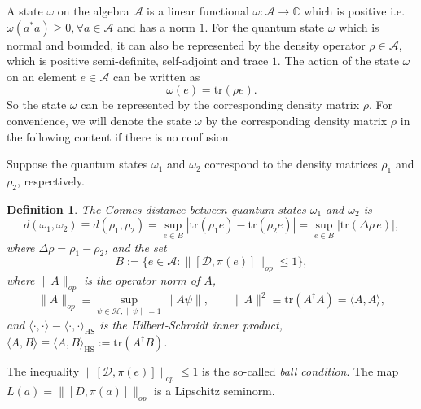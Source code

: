 \documentclass[a4paper,12pt]{article}
\newtheorem{definition}{Definition}
\begin{document}
A state $\omega$ on the algebra $\mathcal{A}$ is a linear functional $\omega :
\mathcal{A} \rightarrow \mathbb{C}$ which is positive i.e. $\omega (a^{\ast}
a) \geq 0, \forall a \in \mathcal{A}$ and has a norm $1$. For the quantum
state $\omega$ which is normal and bounded, it can also be represented by the
density operator $\rho \in \mathcal{A}$, which is positive semi-definite,
self-adjoint and trace $1$. The action of the state $\omega$ on an element $e
\in \mathcal{A}$ can be written as \cite{Revisiting}
\begin{equation}
  \omega (e) = \mathrm{tr} (\rho e) .
\end{equation}
So the state $\omega$ can be represented by the corresponding density matrix
$\rho$. For convenience, we will denote the state $\omega$ by the
corresponding density matrix $\rho$ in the following content if there is no
confusion.

Suppose the quantum states $\omega_1$ and $\omega_2$ correspond to the density
matrices $\rho_1$ and $\rho_2$, respectively.

\begin{definition}
  \cite{Connes1} The Connes distance between quantum states $\omega_1$ and
  $\omega_2$ is
  \begin{equation}
    d (\omega_1, \omega_2) \equiv d (\rho_1, \rho_2) = \sup_{e \in B} |
    \mathrm{tr} (\rho_1 e) - \mathrm{tr} (\rho_2 e) | = \sup_{e \in B} |
    \mathrm{tr} (\Delta \rho \, e) |,
  \end{equation}
  where $\Delta \rho = \rho_1 - \rho_2$, and the set
  \begin{equation}
    B := \{e \in \mathcal{A}: \|[\mathcal{D}, \pi (e)]\|_{op} \leqslant 1\},
  \end{equation}
  where $\|A\|_{op}$ is the operator norm of $A$,
  \begin{equation}
    \|A\|_{op} \equiv \sup_{\psi \in \mathcal{H}, \| \psi \| = 1} \|A \psi \|,
    \qquad \|A\|^2 \equiv \mathrm{tr} (A^{\dag} A) = \langle A, A \rangle,
  \end{equation}
  and $\langle \cdot, \cdot \rangle \equiv \langle \cdot, \cdot
  \rangle_{\mathrm{HS}}$ is the Hilbert-Schmidt inner product, $\langle A, B
  \rangle \equiv \langle A, B \rangle_{\mathrm{HS}} := \mathrm{tr} (A^{\dag}
  B)$.
\end{definition}

The inequality $\|[\mathcal{D}, \pi (e)]\|_{op} \leqslant 1$ is the so-called
\textit{ball condition}. The map $L (a) = \|[D, \pi (a)]\|_{op}$ is
a Lipschitz seminorm.
\end{document}
